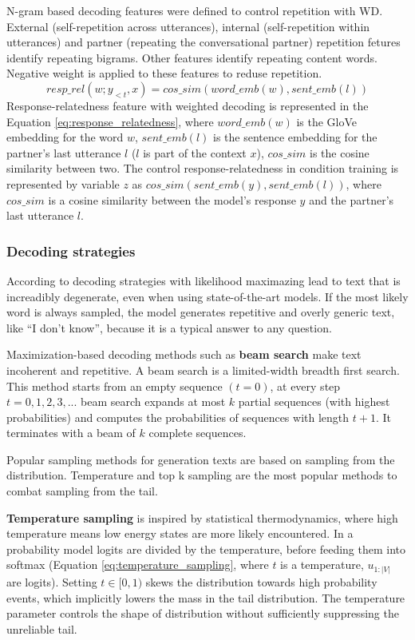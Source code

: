 N-gram based decoding features were defined to control repetition with WD. External (self-repetition across utterances), internal (self-repetition within utterances) and partner (repeating the conversational partner) repetition fetures identify repeating bigrams. Other features identify repeating content words. Negative weight is applied to these features to reduse repetition. 
\begin{equation} \label{eq:response_relatedness}
resp\_rel(w; y_{<t}, x) = cos\_sim(word\_emb(w), sent\_emb(l)) 
\end{equation}
Response-relatedness feature with weighted decoding is represented in the Equation \ref{eq:response_relatedness}, where $word\_emb(w)$ is the GloVe embedding for the word $w$, $sent\_emb(l)$ is the sentence embedding for the partner's last utterance $l$ ($l$ is part of the context $x$), $cos\_sim$ is the cosine similarity between two.
The control response-relatedness in condition training is represented by variable $z$ as $cos\_sim(sent\_emb(y), sent\_emb(l))$, where $cos\_sim$ is a cosine similarity between the model's response $y$ and the partner's last utterance $l$.

\subsubsection{Decoding strategies}
According to \cite{holtzman2019curious} decoding strategies with likelihood maximazing lead to text that is increadibly degenerate, even when using state-of-the-art models. If the most likely word is always sampled, the model generates repetitive and overly generic text, like ``I don't know'', because it is a typical answer to any question.

Maximization-based decoding methods such as \textbf{beam search} make text incoherent and repetitive. A beam search is a limited-width breadth first search. This method starts from an empty sequence $(t=0)$, at every step $t=0, 1, 2, 3,...$ beam search expands at most $k$ partial sequences (with highest probabilities) and computes the probabilities of sequences with length $t+1$. It terminates with a beam of $k$ complete sequences. 

Popular sampling methods for generation texts are based on sampling from the distribution. Temperature and top k sampling are the most popular methods to combat sampling from the tail.

\textbf{Temperature sampling} is inspired by statistical thermodynamics, where high temperature means low energy states are more likely encountered. In a probability model logits are divided by the temperature, before feeding them into softmax (Equation \ref{eq:temperature_sampling}, where $t$ is a temperature, $u_{1:|V|}$ are logits). Setting $t \in [0,1)$ skews the distribution towards high probability events, which implicitly lowers the mass in the tail distribution. The temperature parameter controls the shape of distribution without sufficiently suppressing the unreliable tail.

